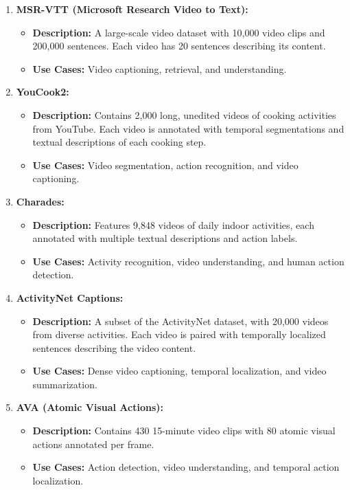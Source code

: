 \begin{enumerate}
\item \textbf{MSR-VTT (Microsoft Research Video to Text):}
\begin{itemize}
\item \textbf{Description:} A large-scale video dataset with 10,000 video clips and 200,000 sentences. Each video has 20 sentences describing its content.
\item \textbf{Use Cases:} Video captioning, retrieval, and understanding.
\end{itemize}

\item \textbf{YouCook2:}
\begin{itemize}
\item \textbf{Description:} Contains 2,000 long, unedited videos of cooking activities from YouTube. Each video is annotated with temporal segmentations and textual descriptions of each cooking step.
\item \textbf{Use Cases:} Video segmentation, action recognition, and video captioning.
\end{itemize}

\item \textbf{Charades:}
\begin{itemize}
\item \textbf{Description:} Features 9,848 videos of daily indoor activities, each annotated with multiple textual descriptions and action labels.
\item \textbf{Use Cases:} Activity recognition, video understanding, and human action detection.
\end{itemize}

\item \textbf{ActivityNet Captions:}
\begin{itemize}
\item \textbf{Description:} A subset of the ActivityNet dataset, with 20,000 videos from diverse activities. Each video is paired with temporally localized sentences describing the video content.
\item \textbf{Use Cases:} Dense video captioning, temporal localization, and video summarization.
\end{itemize}

\item \textbf{AVA (Atomic Visual Actions):}
\begin{itemize}
\item \textbf{Description:} Contains 430 15-minute video clips with 80 atomic visual actions annotated per frame.
\item \textbf{Use Cases:} Action detection, video understanding, and temporal action localization.
\end{itemize}
\end{enumerate}

